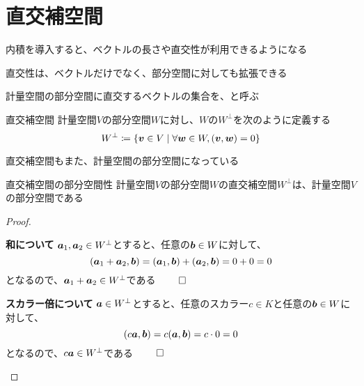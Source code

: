 \documentclass[../../../topic_linear-algebra]{subfiles}
\begin{document}
\sectionline
\section{直交補空間}

内積を導入すると、ベクトルの長さや直交性が利用できるようになる

直交性は、ベクトルだけでなく、部分空間に対しても拡張できる

\br

計量空間の部分空間に直交するベクトルの集合を、と呼ぶ

\begin{definition}{直交補空間}
  計量空間$V$の部分空間$W$に対し、$W$の$W^\perp$を次のように定義する
  \begin{equation*}
    W^\perp \coloneq \{ \vb*{v} \in V \mid \forall \vb*{w} \in W, (\vb*{v}, \vb*{w}) = 0 \}
  \end{equation*}
\end{definition}

\br

直交補空間もまた、計量空間の部分空間になっている

\begin{theorem}{直交補空間の部分空間性}
  計量空間$V$の部分空間$W$の直交補空間$W^\perp$は、計量空間$V$の部分空間である
\end{theorem}

\begin{proof}
  \begin{subpattern}{\bfseries 和について}
    $\vb*{a}_1, \vb*{a}_2 \in W^\perp$とすると、任意の$\vb*{b} \in W$に対して、
    \begin{equation*}
      (\vb*{a}_1 + \vb*{a}_2, \vb*{b}) = (\vb*{a}_1, \vb*{b}) + (\vb*{a}_2, \vb*{b}) = 0 + 0 = 0
    \end{equation*}
    となるので、$\vb*{a}_1 + \vb*{a}_2 \in W^\perp$である $\qed$
  \end{subpattern}

  \begin{subpattern}{\bfseries スカラー倍について}
    $\vb*{a} \in W^\perp$とすると、任意のスカラー$c \in K$と任意の$\vb*{b} \in W$に対して、
    \begin{equation*}
      (c\vb*{a}, \vb*{b}) = c(\vb*{a}, \vb*{b}) = c \cdot 0 = 0
    \end{equation*}
    となるので、$c\vb*{a} \in W^\perp$である $\qed$
  \end{subpattern}
\end{proof}
\end{document}
